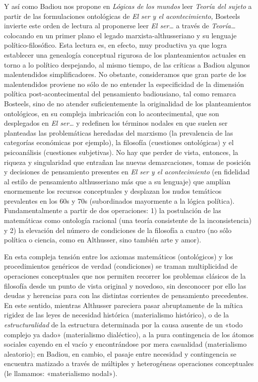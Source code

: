 Y así como Badiou nos propone en \emph{Lógicas de los mundos} leer \emph{Teoría del sujeto} a partir de las formulaciones ontológicas de \emph{El ser y el acontecimiento,} Bosteels invierte este orden de lectura al proponerse leer \emph{El ser\ldots{}} a través de\emph{ Teoría\ldots{}} colocando en un primer plano el legado marxista-althusseriano y su lenguaje político-filosófico. Esta lectura es, en efecto, muy productiva ya que logra establecer una genealogía conceptual rigurosa de los planteamientos actuales en torno a lo político despejando, al mismo tiempo, de las críticas a Badiou algunos malentendidos simplificadores. No obstante, consideramos que gran parte de los malentendidos proviene no sólo de no entender la especificidad de la dimensión política post-acontecimental del pensamiento badiousiano, tal como remarca Bosteels, sino de no atender suficientemente la originalidad de los planteamientos ontológicos, en su compleja imbricación con lo acontecimental, que son desplegados en \emph{El ser\ldots{}} y redefinen los términos nodales en que suelen ser planteadas las problemáticas heredadas del marxismo (la prevalencia de las categorías económicas por ejemplo), la filosofía (cuestiones ontológicas) y el psicoanálisis (cuestiones subjetivas). No hay que perder de vista, entonces, la riqueza y singularidad que entrañan las nuevas demarcaciones, tomas de posición y decisiones de pensamiento presentes en \emph{El ser y el acontecimiento }(en fidelidad al estilo de pensamiento althusseriano más que a su lenguaje) que amplían enormemente los recursos conceptuales y desplazan los nudos temáticos prevalentes en los 60s y 70s (subordinados mayormente a la lógica política). Fundamentalmente a partir de dos operaciones: 1) la postulación de las matemáticas como ontología racional (una teoría consistente de la inconsistencia) y 2) la elevación del número de condiciones de la filosofía a cuatro (no sólo política o ciencia, como en Althusser, sino también arte y amor).

En esta compleja tensión entre los axiomas matemáticos (ontológicos) y los procedimientos genéricos de verdad (condiciones) se traman multiplicidad de operaciones conceptuales que nos permiten recorrer los problemas clásicos de la filosofía desde un punto de vista original y novedoso, sin desconocer por ello las deudas y herencias para con las distintas corrientes de pensamiento precedentes. En este sentido, mientras Althusser pareciera pasar abruptamente de la mítica rigidez de las leyes de necesidad histórica (materialismo histórico), o de la \emph{estructuralidad} de la estructura determinada por la causa ausente de un «todo complejo ya dado» (materialismo dialéctico), a la pura contingencia de los átomos sociales cayendo en el vacío y encontrándose por mera casualidad (materialismo aleatorio); en Badiou, en cambio, el pasaje entre necesidad y contingencia se encuentra matizado a través de múltiples y heterogéneas operaciones conceptuales (le llamamos: «materialismo nodal»).

